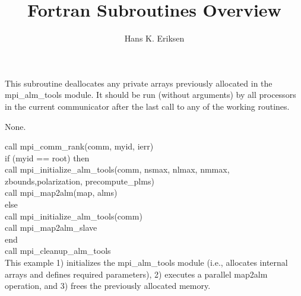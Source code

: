 
\sloppy


\title{\healpix Fortran Subroutines Overview}
 \section[mpi\_cleanup\_alm\_tools]{ }
\label{sub:mpi_cleanup_alm_tools}
\author{Hans K. Eriksen}

\begin{facility}
{This subroutine deallocates any private arrays previously allocated
in the mpi\_alm\_tools module. It should be run (without arguments) by
all processors in the current communicator after the last call to any
of the working routines. 
}
{\modMpiAlmTools}
\end{facility}

\begin{f90format}
{}
\end{f90format}

\begin{arguments}
{
None.
}
\end{arguments}

\begin{example}
{
call mpi\_comm\_rank(comm, myid, ierr)\\
if (myid == root) then\\
\hspace*{1cm}call mpi\_initialize\_alm\_tools(comm, nsmax, nlmax, nmmax, \\
\hspace*{3cm}zbounds,polarization, precompute\_plms)\\
\hspace*{1cm}call mpi\_map2alm(map, alms)\\
else \\
\hspace*{1cm}call mpi\_initialize\_alm\_tools(comm)\\
\hspace*{1cm}call mpi\_map2alm\_slave\\
end\\
call mpi\_cleanup\_alm\_tools\\
}
{
This example 1) initializes the mpi\_alm\_tools module (i.e.,
allocates internal arrays and defines required parameters), 2)
executes a parallel map2alm operation, and 3) frees the previously
allocated memory.
}
\end{example}

